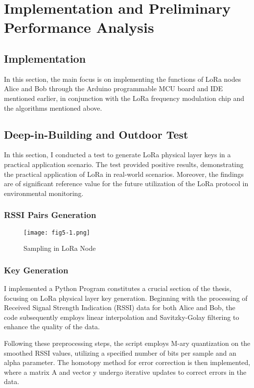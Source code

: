 
\chapter{Implementation and Preliminary Performance Analysis}

\section{Implementation}
In this section, the main focus is on implementing the functions of LoRa nodes Alice and Bob through the Arduino programmable MCU board and IDE mentioned earlier, in conjunction with the LoRa frequency modulation chip and the algorithms mentioned above.

\section{Deep-in-Building and Outdoor Test}
In this section, I conducted a test to generate LoRa physical layer keys in a practical application scenario. The test provided positive results, demonstrating the practical application of LoRa in real-world scenarios. Moreover, the findings are of significant reference value for the future utilization of the LoRa protocol in environmental monitoring.

\subsection{RSSI Pairs Generation}

\begin{figure}
  \centering
  \texttt{[image: fig5-1.png]}
  \caption{Sampling in LoRa Node}
  \label{fig:5-1}
\end{figure}

\subsection{Key Generation}
I implemented a Python Program constitutes a crucial section of the thesis, focusing on LoRa physical layer key generation. Beginning with the processing of Received Signal Strength Indication (RSSI) data for both Alice and Bob, the code subsequently employs linear interpolation and Savitzky-Golay filtering to enhance the quality of the data.

Following these preprocessing steps, the script employs M-ary quantization on the smoothed RSSI values, utilizing a specified number of bits per sample and an alpha parameter. The homotopy method for error correction is then implemented, where a matrix A and vector y undergo iterative updates to correct errors in the data.


